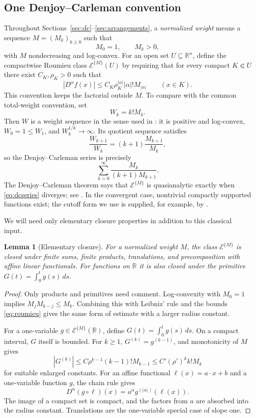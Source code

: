 \documentclass[11pt]{article}
\newtheorem{lemma}[theorem]{Lemma}
\theoremstyle{definition}
\theoremstyle{remark}
\newcommand{\R}{\mathbb{R}}
\begin{document}
\subsection{One Denjoy--Carleman convention}

Throughout Sections~\ref{sec:dc}--\ref{sec:arrangements}, a \emph{normalized weight} means a sequence $M=(M_k)_{k\ge0}$ such that
\[
 M_0=1,
 \qquad M_k>0,
\]
with $M$ nondecreasing and log-convex. For an open set $U\subseteq\R^n$, define the compactwise Roumieu class $\mathcal{E}^{\{M\}}(U)$ by requiring that for every compact $K\Subset U$ there exist $C_K,\rho_K>0$ such that
\begin{equation}\label{eq:roumieu}
 |D^\alpha f(x)|
 \le C_K\rho_K^{|\alpha|}|\alpha|!M_{|\alpha|}
 \qquad (x\in K).
\end{equation}
This convention keeps the factorial outside $M$. To compare with the common total-weight convention, set
\[
 W_k=k!M_k.
\]
Then $W$ is a weight sequence in the sense used in \cite{Rainer2022}: it is positive and log-convex, $W_0=1\le W_1$, and $W_k^{1/k}\to\infty$. Its quotient sequence satisfies
\[
 \frac{W_{k+1}}{W_k}
 =(k+1)\frac{M_{k+1}}{M_k},
\]
so the Denjoy--Carleman series is precisely
\begin{equation}\label{eq:dcseries}
 \sum_{k=0}^{\infty}\frac{M_k}{(k+1)M_{k+1}}.
\end{equation}
The Denjoy--Carleman theorem says that $\mathcal{E}^{\{M\}}$ is quasianalytic exactly when \eqref{eq:dcseries} diverges; see \cite[Theorem~3.6]{Rainer2022}. In the convergent case, nontrivial compactly supported functions exist; the cutoff form we use is supplied, for example, by \cite[Corollary~3.12]{Rainer2022}.

We will need only elementary closure properties in addition to this classical input.

\begin{lemma}[Elementary closure]\label{lem:closure}
For a normalized weight $M$, the class $\mathcal{E}^{\{M\}}$ is closed under finite sums, finite products, translations, and precomposition with affine linear functionals. For functions on $\R$ it is also closed under the primitive $G(t)=\int_0^t g(s)\,ds$.
\end{lemma}

\begin{proof}
Only products and primitives need comment. Log-convexity with $M_0=1$ implies $M_jM_{k-j}\le M_k$. Combining this with Leibniz' rule and the bounds \eqref{eq:roumieu} gives the same form of estimate with a larger radius constant.

For a one-variable $g\in\mathcal{E}^{\{M\}}(\R)$, define $G(t)=\int_0^t g(s)\,ds$. On a compact interval, $G$ itself is bounded. For $k\ge1$, $G^{(k)}=g^{(k-1)}$, and monotonicity of $M$ gives
\[
 |G^{(k)}|
 \le C\rho^{k-1}(k-1)!M_{k-1}
 \le C'({\rho}')^k k!M_k
\]
for suitable enlarged constants. For an affine functional $\ell(x)=a\cdot x+b$ and a one-variable function $g$, the chain rule gives
\[
 D^\alpha(g\circ\ell)(x)=a^\alpha g^{(|\alpha|)}(\ell(x)).
\]
The image of a compact set is compact, and the factors from $a$ are absorbed into the radius constant. Translations are the one-variable special case of slope one.
\end{proof}
\end{document}
